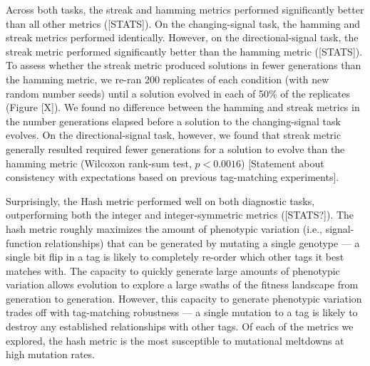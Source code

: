 Across both tasks, the streak and hamming metrics performed significantly better than all other metrics ([STATS]).
On the changing-signal task, the hamming and streak metrics performed identically.
However, on the directional-signal task, the streak metric performed significantly better than the hamming metric ([STATS]).
To assess whether the streak metric produced solutions in fewer generations than the hamming metric, we re-ran 200 replicates of each condition (with new random number seeds) until a solution evolved in each of 50\% of the replicates (Figure [X]).
We found no difference between the hamming and streak metrics in the number generations elapsed before a solution to the changing-signal task evolves.
On the directional-signal task, however, we found that streak metric generally resulted required fewer generations for a solution to evolve than the hamming metric (Wilcoxon rank-sum test, $p < 0.0016$)
[Statement about consistency with expectations based on previous tag-matching experiments].

Surprisingly, the Hash metric performed well on both diagnostic tasks, outperforming both the integer and integer-symmetric metrics ([STATS?]).
The hash metric roughly maximizes the amount of phenotypic variation (i.e., signal-function relationships) that can be generated by mutating a single genotype --- a single bit flip in a tag is likely to completely re-order which other tags it best matches with.
The capacity to quickly generate large amounts of phenotypic variation allows evolution to explore a large swaths of the fitness landscape from generation to generation.
However, this capacity to generate phenotypic variation trades off with tag-matching robustness --- a single mutation to a tag is likely to destroy any established relationships with other tags.
Of each of the metrics we explored, the hash metric is the most susceptible to mutational meltdowns at high mutation rates.



